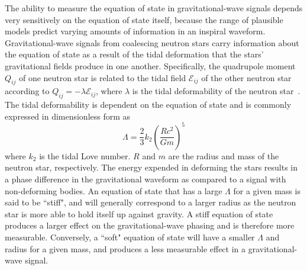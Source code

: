 The ability to measure the equation of state in gravitational-wave signals depends very sensitively on the equation of state itself, because the range of plausible models predict varying amounts of information in an inspiral waveform. Gravitational-wave signals from coalescing neutron stars carry information about the equation of state as a result of the tidal deformation that the stars' gravitational fields produce in one another. Specifically, the quadrupole moment $Q_{ij}$ of one neutron star is related to the tidal field $\mathcal{E}_{ij}$ of the other neutron star according to $Q_{ij} = -\lambda\mathcal{E}_{ij}$, where $\lambda$ is the tidal deformability of the neutron star~\cite{Flanagan:2007ix}. The tidal deformability is dependent on the equation of state and is commonly expressed in dimensionless form as
\begin{equation}
    \Lambda=\frac{2}{3}k_{2}\left(\frac{Rc^{2}}{Gm}\right)^5
\end{equation}
where $k_{2}$ is the tidal Love number. $R$ and $m$ are the radius and mass of the neutron star, respectively. The energy expended in deforming the stars results in a phase difference in the gravitational waveform as compared to a signal with non-deforming bodies. An equation of state that has a large $\Lambda$ for a given mass is said to be ``stiff", and will generally correspond to a larger radius as the neutron star is more able to hold itself up against gravity. A stiff equation of state produces a larger effect on the gravitational-wave phasing and is therefore more measurable. Conversely, a ``soft" equation of state will have a smaller $\Lambda$ and radius for a given mass, and produces a less measurable effect in a gravitational-wave signal.

